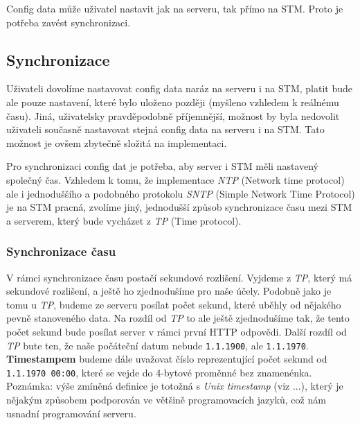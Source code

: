 
Config data může uživatel nastavit jak na serveru, tak přímo na STM.
Proto je potřeba zavést synchronizaci.

\subsection{Synchronizace}

Uživateli dovolíme nastavovat config data naráz na serveru i na STM, platit bude ale pouze
nastavení, které bylo uloženo později (myšleno vzhledem k reálnému času).
Jiná, uživatelsky pravděpodobně příjemnější, možnost by byla nedovolit uživateli současně
nastavovat stejná config data na serveru i na STM.
Tato možnost je ovšem zbytečně složitá na implementaci.

Pro synchronizaci config dat je potřeba, aby server i STM měli nastavený společný čas.
Vzhledem k tomu, že implementace \emph{NTP} (Network time protocol) ale i jednoduššího a podobného
protokolu \emph{SNTP} (Simple Network Time Protocol) je na STM pracná, zvolíme jiný, jednodušší způsob synchronizace
času mezi STM a serverem, který bude vycházet z \emph{TP} (Time protocol).

\subsubsection{Synchronizace času}
V rámci synchronizace času postačí sekundové rozlišení.
Vyjdeme z \emph{TP}, který má sekundové rozlišení, a ještě ho zjednodušíme pro naše účely.
Podobně jako je tomu u \emph{TP}, budeme ze serveru posílat počet sekund, které
uběhly od nějakého pevně stanoveného data.
Na rozdíl od \emph{TP} to ale ještě zjednodušíme tak, že tento počet sekund bude posílat server
v rámci první HTTP odpovědi.
Další rozdíl od \emph{TP} bute ten, že naše počáteční datum nebude \texttt{1.1.1900}, ale \texttt{1.1.1970}.
\textbf{Timestampem} budeme dále uvažovat číslo reprezentující počet sekund od \texttt{1.1.1970 00:00},
které se vejde do 4-bytové proměnné bez znamenénka.
Poznámka: výše zmíněná definice je totožná s \emph{Unix timestamp} (viz ...), který je nějakým způsobem
podporován ve většině programovacích jazyků, což nám usnadní programování serveru.

